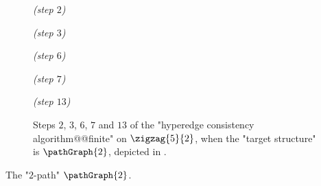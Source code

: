 \begin{figure}
	\centering
	\begin{tikzpicture}
		
		
	\end{tikzpicture}
	\quad\emph{(step $2$)~}\\[2em]
	\begin{tikzpicture}
		
		
	\end{tikzpicture}
	\quad\emph{(step $3$)~}\\[2em]
	\begin{tikzpicture}
		
		
	\end{tikzpicture}
	\quad\emph{(step $6$)~}\\[2em]
	\begin{tikzpicture}
		
		
	\end{tikzpicture}
	\quad\emph{(step $7$)~}\\[2em]
	\begin{tikzpicture}
		
		
	\end{tikzpicture}
	\quad\emph{(step $13$)}
	\caption{%
		\AP\label{fig:zigzag-graph-HC-P2}
		Steps $2$, $3$, $6$, $7$ and $13$ of the "hyperedge consistency algorithm@@finite"
		on $\zigzag{5}{2}$,
		when the "target structure" is $\pathGraph{2}$, depicted in .%
	}
\end{figure}
\begin{marginfigure}[-9.5em]
	\centering
	\begin{tikzpicture}
		
	\end{tikzpicture}
	\caption{
		\AP\label{fig:zigzag-graph-HC-P2-side-P2}
		The "$2$-path" $\pathGraph{2}$.
	}
\end{marginfigure}
